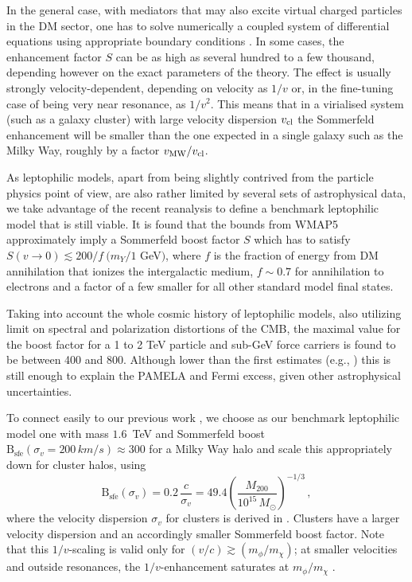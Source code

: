 \documentclass[10pt,aps,pra,reprint,amsmath,amsfonts,amssymb,showpacs,nofootinbib,floatfix]{revtex4-1}
\newcommand{\rmn}{\mathrm}
\newcommand{\sfe}{\rmn{sfe}}
\newcommand{\msun}{M_\odot}
\newcommand{\B}{\rmn{B}}
\newcommand{\sigv}{\ensuremath{\sigma_v}}
\newcommand{\mvir}{M_{200}}
\begin{document}
In the general case, with mediators that may also excite virtual
charged particles in the DM sector, one has to solve numerically a
coupled system of differential equations using appropriate boundary
conditions
\cite{2005PhRvD..71f3528H,2007NuPhB.787..152C,2009PhRvD..79a5014A}. In
some cases, the enhancement factor $S$ can be as high as several
hundred to a few thousand, depending however on the exact parameters
of the theory. The effect is usually strongly velocity-dependent,
depending on velocity as $1/v$ or, in the fine-tuning case of being
very near resonance, as $1/v^2$. This means that in a virialised
system (such as a galaxy cluster) with large velocity dispersion
$v_{\rm cl}$ the Sommerfeld enhancement will be smaller than the one
expected in a single galaxy such as the Milky Way, roughly by a factor
$v_{\rm MW}/v_{\rm cl}$.


As leptophilic models, apart from being slightly contrived from the
particle physics point of view, are also rather limited by several
sets of astrophysical data, we take advantage of the recent reanalysis
\cite{Finkbeiner:2010sm} to define a benchmark leptophilic model that
is still viable.  It is found that the bounds from WMAP5 approximately
imply a Sommerfeld boost factor $S$ which has to satisfy $S(v\to
0)\lesssim 200/f\ (m_Y/1$ GeV$)$, where $f$ is the fraction of energy
from DM annihilation that ionizes the intergalactic medium,
$f\sim 0.7$ for annihilation to electrons and a factor of a few smaller
for all other standard model final states.

Taking into account the whole cosmic history of leptophilic models,
also utilizing limit on spectral and polarization distortions of the
CMB, the maximal value for the boost factor for a 1 to 2 TeV particle
and sub-GeV force carriers is found to be \cite{Finkbeiner:2010sm}
between 400 and 800. Although lower than the first estimates (e.g.,
\cite{Bergstrom:2009fa,Meade:2009iu}) this is still enough to explain
the PAMELA and Fermi excess, given other astrophysical uncertainties.

To connect easily to our previous work \cite{2009PhRvL.103r1302P}, we
choose as our benchmark leptophilic model one with mass $1.6$~TeV and
Sommerfeld boost $\B_\sfe(\sigv=200\,km/s)\approx 300$ for a Milky Way
halo and scale this appropriately down for cluster halos, using
\begin{equation}
\B_\sfe(\sigv) = 0.2\, \frac{c}{\sigv} = 
49.4 \left(\frac{\mvir}{10^{15}\,\msun}\right)^{-1/3}\,,
\label{eq:B_sfe}
\end{equation}
where the velocity dispersion $\sigv$ for clusters is derived in
\cite{2005RvMP...77..207V}. Clusters have a larger velocity dispersion
and an accordingly smaller Sommerfeld boost factor. Note that this
$1/v$-scaling is valid only for $(v/c) \gtrsim (m_\phi/m_\chi)$; at
smaller velocities and outside resonances, the $1/v$-enhancement
saturates at $m_\phi/m_\chi$ \cite{2008PhRvL.101z1301K}.
\end{document}
